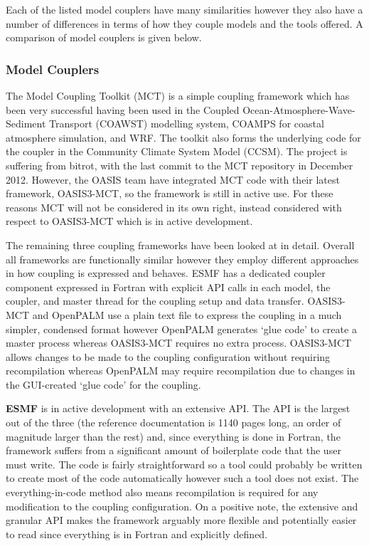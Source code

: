\documentclass{acm_proc_article-sp}
\renewcommand{\_}{\underscore\hspace{0pt}}
\begin{document}
Each of the listed model couplers have many similarities however they also have
a number of differences in terms of how they couple models and the tools
offered. A comparison of model couplers is given below.

\subsubsection*{Model Couplers}

The Model Coupling Toolkit (MCT) \cite{Larson2005,Jacob2005} is a simple
coupling framework which has been very successful having been used in the
Coupled Ocean-Atmosphere-Wave-Sediment Transport (COAWST) modelling system,
COAMPS for coastal atmosphere simulation, and WRF. The toolkit also forms the
underlying code for the coupler in the Community Climate System Model (CCSM).
The project is suffering from bitrot, with the last commit to the MCT repository
in December 2012. However, the OASIS team have integrated MCT code with their
latest framework, OASIS3-MCT, so the framework is still in active use. For these
reasons MCT will not be considered in its own right, instead considered with
respect to OASIS3-MCT which is in active development.

The remaining three coupling frameworks have been looked at in detail. Overall
all frameworks are functionally similar however they employ different approaches
in how coupling is expressed and behaves. ESMF has a dedicated coupler component
expressed in Fortran with explicit API calls in each model, the coupler, and
master thread for the coupling setup and data transfer. OASIS3-MCT and OpenPALM
use a plain text file to express the coupling in a much simpler, condensed
format however OpenPALM generates `glue code' to create a master process whereas
OASIS3-MCT requires no extra process. OASIS3-MCT allows changes to be made to
the coupling configuration without requiring recompilation whereas OpenPALM may
require recompilation due to changes in the GUI-created `glue code' for the
coupling.

\textbf{ESMF} is in active development with an extensive API. The API is the
largest out of the three (the reference documentation is 1140 pages long, an
order of magnitude larger than the rest) and, since everything is done in
Fortran, the framework suffers from a significant amount of boilerplate code
that the user must write. The code is fairly straightforward so a tool could
probably be written to create most of the code automatically however such a tool
does not exist. The everything-in-code method also means recompilation is
required for any modification to the coupling configuration. On a positive note,
the extensive and granular API makes the framework arguably more flexible and
potentially easier to read since everything is in Fortran and explicitly
defined.
\end{document}
